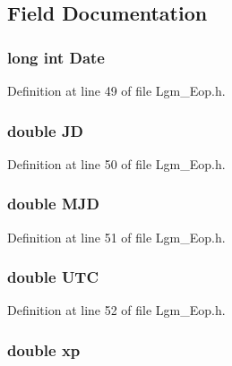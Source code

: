 \subsection{Field Documentation}
\hypertarget{struct_lgm___eop_one_8c1b7b17183e48a6fafaf6302e1b1da9}{
\subsubsection[{Date}]{\setlength{\rightskip}{0pt plus 5cm}long int {\bf Date}}}
\label{struct_lgm___eop_one_8c1b7b17183e48a6fafaf6302e1b1da9}




Definition at line 49 of file Lgm\_\-Eop.h.\hypertarget{struct_lgm___eop_one_fca64005cd84fa9e811dac5219a618ad}{
\subsubsection[{JD}]{\setlength{\rightskip}{0pt plus 5cm}double {\bf JD}}}
\label{struct_lgm___eop_one_fca64005cd84fa9e811dac5219a618ad}




Definition at line 50 of file Lgm\_\-Eop.h.\hypertarget{struct_lgm___eop_one_38c1b91ef6994f7a99c5b3eccd97d1e8}{
\subsubsection[{MJD}]{\setlength{\rightskip}{0pt plus 5cm}double {\bf MJD}}}
\label{struct_lgm___eop_one_38c1b91ef6994f7a99c5b3eccd97d1e8}




Definition at line 51 of file Lgm\_\-Eop.h.\hypertarget{struct_lgm___eop_one_4eccefabe940625eb9277991aa138a38}{
\subsubsection[{UTC}]{\setlength{\rightskip}{0pt plus 5cm}double {\bf UTC}}}
\label{struct_lgm___eop_one_4eccefabe940625eb9277991aa138a38}




Definition at line 52 of file Lgm\_\-Eop.h.\hypertarget{struct_lgm___eop_one_f649efec4c4f51f4db0ebb935a83d015}{
\subsubsection[{xp}]{\setlength{\rightskip}{0pt plus 5cm}double {\bf xp}}}
\label{struct_lgm___eop_one_f649efec4c4f51f4db0ebb935a83d015}




